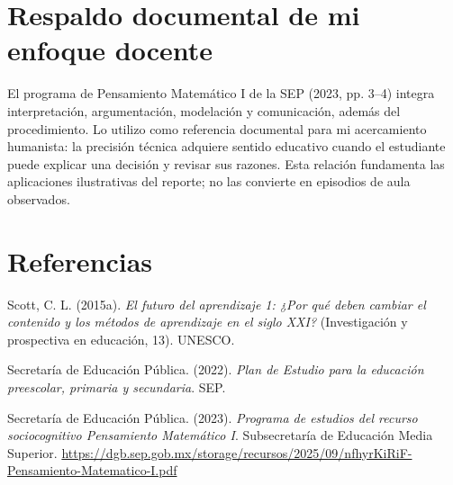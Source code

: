 \documentclass[spanish,letterpaper,oneside]{article}
\begin{document}
\section{Respaldo documental de mi enfoque docente}
El programa de Pensamiento Matemático I de la SEP (2023, pp. 3--4) integra interpretación, argumentación, modelación y comunicación, además del procedimiento. Lo utilizo como referencia documental para mi acercamiento humanista: la precisión técnica adquiere sentido educativo cuando el estudiante puede explicar una decisión y revisar sus razones. Esta relación fundamenta las aplicaciones ilustrativas del reporte; no las convierte en episodios de aula observados.
\section*{Referencias}
{\setlength{\parskip}{6pt}
\par\hangindent=1.27cm  Scott, C. L. (2015a). \textit{El futuro del aprendizaje 1: ¿Por qué deben cambiar el contenido y los métodos de aprendizaje en el siglo XXI?} (Investigación y prospectiva en educación, 13). UNESCO.
\par\hangindent=1.27cm  Secretaría de Educación Pública. (2022). \textit{Plan de Estudio para la educación preescolar, primaria y secundaria}. SEP.
\par\hangindent=1.27cm Secretaría de Educación Pública. (2023). \textit{Programa de estudios del recurso sociocognitivo Pensamiento Matemático I}. Subsecretaría de Educación Media Superior. \url{https://dgb.sep.gob.mx/storage/recursos/2025/09/nfhyrKiRiF-Pensamiento-Matematico-I.pdf}
}
\end{document}
